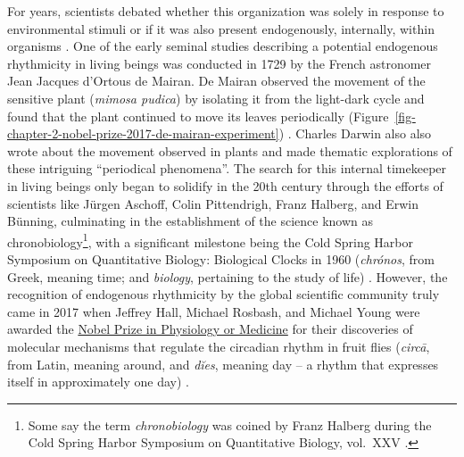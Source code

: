 \documentclass[
12pt,
openright,
oneside,
a4paper,
chapter=TITLE,
section=TITLE,
french,
spanish,
brazil,
english
]{abntex2}\usepackage{array}
\begin{document}
For years, scientists debated whether this organization was solely in
response to environmental stimuli or if it was also present
endogenously, internally, within organisms \autocite{rotenberg2003}. One
of the early seminal studies describing a potential endogenous
rhythmicity in living beings was conducted in 1729 by the French
astronomer Jean Jacques d'Ortous de Mairan. De Mairan observed the
movement of the sensitive plant (\emph{mimosa pudica}) by isolating it
from the light-dark cycle and found that the plant continued to move its
leaves periodically
(Figure~\ref{fig-chapter-2-nobel-prize-2017-de-mairan-experiment})
\autocite{demairan1729,rotenberg2003}. Charles Darwin also also wrote
about the movement observed in plants and made thematic explorations of
these intriguing ``periodical phenomena''\autocite{andrade2024}. The
search for this internal timekeeper in living beings only began to
solidify in the 20th century through the efforts of scientists like
Jürgen Aschoff, Colin Pittendrigh, Franz Halberg, and Erwin Bünning,
culminating in the establishment of the science known as
chronobiology\footnote{Some say the term \emph{chronobiology} was coined
  by Franz Halberg during the Cold Spring Harbor Symposium on
  Quantitative Biology, vol.~XXV \autocite[21]{menna-barreto2023}.},
with a significant milestone being the Cold Spring Harbor Symposium on
Quantitative Biology: Biological Clocks in 1960 (\emph{chrónos}, from
Greek, meaning time; and \emph{biology}, pertaining to the study of
life) \autocite{rotenberg2003,coldspringharborlaboratory}. However, the
recognition of endogenous rhythmicity by the global scientific community
truly came in 2017 when Jeffrey Hall, Michael Rosbash, and Michael Young
were awarded the
\href{https://www.nobelprize.org/prizes/medicine/2017/press-release/}{Nobel
Prize in Physiology or Medicine} for their discoveries of molecular
mechanisms that regulate the circadian rhythm in fruit flies
(\emph{circā}, from Latin, meaning around, and \emph{dĭes}, meaning day
\autocite{latinitium} -- a rhythm that expresses itself in approximately
one day) \autocite{nobelprizeoutreachab}.
\end{document}
